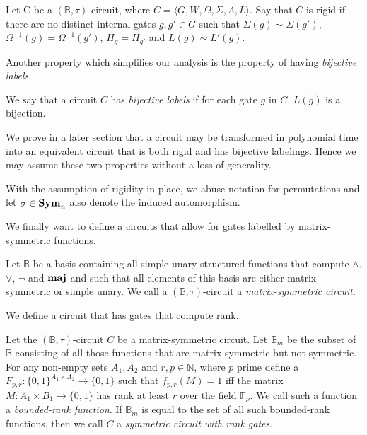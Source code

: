 \documentclass[../paper.tex]{subfiles}
\begin{document}
\begin{definition}[Rigidity]
  Let C be a $(\mathbb{B}, \tau)$-circuit, where $C = \langle G, W, \Omega,
  \Sigma, \Lambda, L\rangle$. Say that $C$ is rigid if there are no distinct
  internal gates $g, g' \in G$ such that $\Sigma(g) \sim \Sigma (g')$,
  $\Omega^{-1}(g) = \Omega^{-1}(g')$, $H_g = H_{g'}$ and $L(g) \sim L'(g)$.
\end{definition}

Another property which simplifies our analysis is the property of having
\emph{bijective labels}.

\begin{definition}
  We say that a circuit $C$ has \emph{bijective labels} if for each gate $g$ in
  $C$, $L(g)$ is a bijection.
\end{definition}

We prove in a later section that a circuit may be transformed in polynomial time
into an equivalent circuit that is both rigid and has bijective labelings. Hence
we may assume these two properties without a loss of generality.

With the assumption of rigidity in place, we abuse notation for permutations and
let $\sigma \in \text{\textbf{Sym}}_n$ also denote the induced automorphism.

We finally want to define a circuits that allow for gates labelled by
matrix-symmetric functions.
\begin{definition}
  Let $\mathbb{B}$ be a basis containing all simple unary structured functions
  that compute $\land$, $\lor$, $\neg$ and $\text{\textbf{maj}}$ and such that all elements of
  this basis are either matrix-symmetric or simple unary. We call a
  $(\mathbb{B}, \tau)$-circuit a \emph{matrix-symmetric circuit}.
\end{definition}

We define a circuit that has gates that compute rank.
\begin{definition}
  Let the $(\mathbb{B}, \tau)$-circuit $C$ be a matrix-symmetric circuit. Let
  $\mathbb{B}_m$ be the subset of $\mathbb{B}$ consisting of all those functions
  that are matrix-symmetric but not symmetric. For any non-empty sets $A_1, A_2$
  and $r, p \in \mathbb{N}$, where $p$ prime define a $F_{p,r}: \{0,1\}^{A_1
    \times A_2} \rightarrow \{0,1\}$ such that $f_{p,r}(M) = 1$ iff the matrix
  $M: A_1 \times B_1 \rightarrow \{0,1\}$ has rank at least $r$ over the field
  $\mathbb{F}_p$. We call such a function a \emph{bounded-rank function}. If
  $\mathbb{B}_m$ is equal to the set of all such bounded-rank functions, then we
  call $C$ a \emph{symmetric circuit with rank gates}.
\end{definition}
\end{document}

